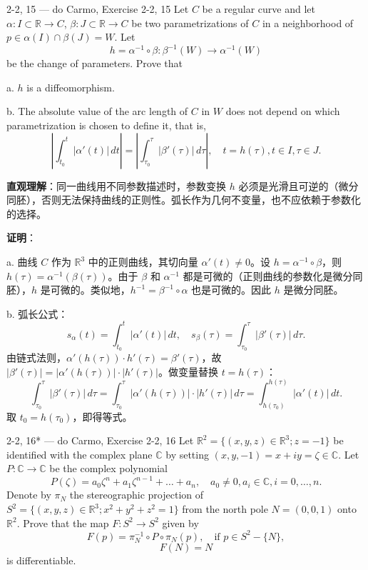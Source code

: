 \begin{exercise}{2-2, 15 — do Carmo, Exercise 2-2, 15}
Let $C$ be a regular curve and let $\alpha: I \subset \mathbb{R} \to C$, $\beta: J \subset \mathbb{R} \to C$ be two parametrizations of $C$ in a neighborhood of $p \in \alpha(I) \cap \beta(J) = W$. Let
\[
h = \alpha^{-1} \circ \beta: \beta^{-1}(W) \to \alpha^{-1}(W)
\]
be the change of parameters. Prove that

a. $h$ is a diffeomorphism.

b. The absolute value of the arc length of $C$ in $W$ does not depend on which parametrization is chosen to define it, that is,
\[
\left| \int_{t_0}^{t} |\alpha'(t)| \, dt \right| = \left| \int_{\tau_0}^{\tau} |\beta'(\tau)| \, d\tau \right|, \quad t = h(\tau), t \in I, \tau \in J.
\]
\end{exercise}

\begin{solution}
\textbf{直观理解}：同一曲线用不同参数描述时，参数变换 $h$ 必须是光滑且可逆的（微分同胚），否则无法保持曲线的正则性。弧长作为几何不变量，也不应依赖于参数化的选择。

\textbf{证明}：

a. 曲线 $C$ 作为 $\mathbb{R}^3$ 中的正则曲线，其切向量 $\alpha'(t) \neq 0$。设 $h = \alpha^{-1} \circ \beta$，则 $h(\tau) = \alpha^{-1}(\beta(\tau))$。由于 $\beta$ 和 $\alpha^{-1}$ 都是可微的（正则曲线的参数化是微分同胚），$h$ 是可微的。类似地，$h^{-1} = \beta^{-1} \circ \alpha$ 也是可微的。因此 $h$ 是微分同胚。

b. 弧长公式：
\[
s_\alpha(t) = \int_{t_0}^{t} |\alpha'(t)|\, dt, \quad s_\beta(\tau) = \int_{\tau_0}^{\tau} |\beta'(\tau)|\, d\tau.
\]
由链式法则，$\alpha'(h(\tau)) \cdot h'(\tau) = \beta'(\tau)$，故 $|\beta'(\tau)| = |\alpha'(h(\tau))| \cdot |h'(\tau)|$。做变量替换 $t = h(\tau)$：
\[
\int_{\tau_0}^{\tau} |\beta'(\tau)|\, d\tau = \int_{\tau_0}^{\tau} |\alpha'(h(\tau))| \cdot |h'(\tau)|\, d\tau = \int_{h(\tau_0)}^{h(\tau)} |\alpha'(t)|\, dt.
\]
取 $t_0 = h(\tau_0)$，即得等式。
\end{solution}

\begin{exercise}{2-2, 16* — do Carmo, Exercise 2-2, 16}
Let $\mathbb{R}^2 = \{(x, y, z) \in \mathbb{R}^3; z = -1\}$ be identified with the complex plane $\mathbb{C}$ by setting $(x, y, -1) = x + iy = \zeta \in \mathbb{C}$. Let $P: \mathbb{C} \to \mathbb{C}$ be the complex polynomial
\[
P(\zeta) = a_0 \zeta^n + a_1 \zeta^{n-1} + \dots + a_n, \quad a_0 \neq 0, a_i \in \mathbb{C}, i = 0, \dots, n.
\]
Denote by $\pi_N$ the stereographic projection of $S^2 = \{(x,y,z)\in \mathbb{R}^3; x^2 + y^2 + z^2 = 1\}$ from the north pole $N = (0,0,1)$ onto $\mathbb{R}^2$. Prove that the map $F: S^2 \to S^2$ given by
\[
F(p) = \pi_N^{-1} \circ P \circ \pi_N(p), \quad \text{if } p \in S^2 - \{N\},
\]
\[
F(N) = N
\]
is differentiable.
\end{exercise}

